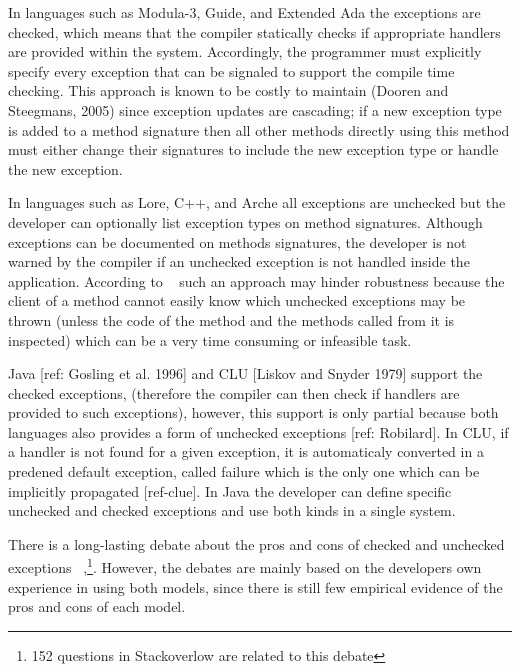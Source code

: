 \documentclass[conference]{IEEEtran}
\begin{document}
In languages such as Modula-3, Guide, and Extended Ada the exceptions are 
checked, which means that the compiler statically checks if appropriate handlers 
are provided within the system. Accordingly, the programmer must explicitly specify 
every exception that can be signaled to support the compile time checking. This approach is known to be
costly to maintain (Dooren and Steegmans, 2005) since exception updates are
cascading; if a new exception type is added to a method signature then all other
methods directly using this method must either change their signatures to
include the new exception type or handle the new exception. 

In languages such as Lore, C++, and Arche all exceptions are unchecked but the developer can 
optionally list exception types on method signatures. Although exceptions can 
be documented on methods signatures, the developer is not warned by the compiler
if an unchecked exception is not handled inside the application. According to ~\cite{Robil00} 
such an approach may hinder robustness because the client of a method cannot easily know
which unchecked exceptions may be thrown (unless the code of the method and the
methods called from it is inspected) which can be a very time consuming or
infeasible task. 

Java [ref: Gosling et al. 1996] and CLU [Liskov and Snyder 1979] support the checked exceptions,
 (therefore the compiler can then check if handlers are provided to such exceptions), however, this support is 
only partial because both languages also provides a form of unchecked exceptions [ref: Robilard].
In CLU,  if a handler is not found for a given exception, it is automaticaly converted in a predened default exception, 
called failure which is the only one which can be implicitly propagated [ref-clue].
 In Java the developer can define specific unchecked and checked exceptions and use both kinds in a single system.

There is a long-lasting debate about the pros and cons of checked and unchecked exceptions 
~\cite{javatut,stackoverlow,debate},\footnote{152 questions in Stackoverlow
are related to this debate}. However, the debates are mainly based on the developers own experience in
using both models, since there is still few empirical evidence of the pros and cons of each model.

\end{document}
